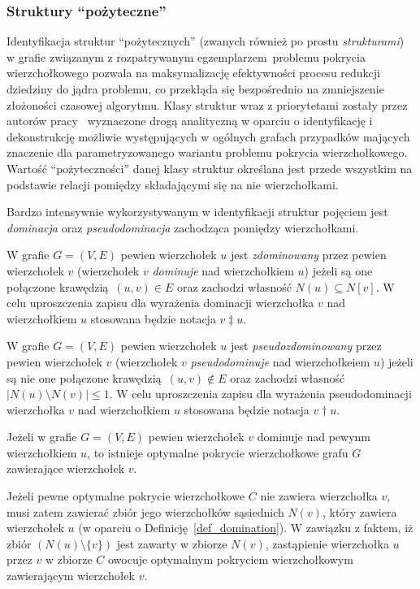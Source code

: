 \subsubsection{\textbf{Struktury ``pożyteczne''}}
\label{sss_ckx_structures}
\par{
  Identyfikacja struktur ``pożytecznych'' (zwanych również po prostu \emph{strukturami}) w grafie związanym z rozpatrywanym egzemplarzem problemu pokrycia wierzchołkowego pozwala na maksymalizację efektywności procesu redukcji dziedziny do jądra problemu, co przekłąda się bezpośrednio na zmniejszenie złożoności czasowej algorytmu. Klasy struktur wraz z priorytetami zostały przez autorów pracy~\cite{ImprovedBounds10} wyznaczone drogą analityczną w oparciu o identyfikację i dekonstrukcję możliwie występujących w ogólnych grafach przypadków mających znaczenie dla parametryzowanego wariantu problemu pokrycia wierzchołkowego.
  Wartość ``pożyteczności'' danej klasy struktur określana jest przede wszystkim na podstawie relacji pomiędzy składającymi się na nie wierzchołkami.
}
\par{
  Bardzo intensywnie wykorzystywanym w identyfikacji struktur pojęciem jest \emph{dominacja} oraz \emph{pseudodominacja} zachodząca pomiędzy wierzchołkami.
  \begin{definition}
    W grafie $G=(V, E)$ pewien wierzchołek $u$ jest \emph{zdominowany} przez pewien wierzchołek $v$ (wierzchołek $v$ \emph{dominuje} nad wierzchołkiem $u$) jeżeli są one połączone krawędzią $(u, v) \in E$ oraz zachodzi własność $N(u) \subseteq N[v]$.
    W celu uproszczenia zapisu dla wyrażenia dominacji wierzchołka $v$ nad wierzchołkiem $u$ stosowana będzie notacja $v \ddagger u$.
  \end{definition}
  \begin{definition}
    W grafie $G=(V, E)$ pewien wierzchołek $u$ jest \emph{pseudozdominowany} przez pewien wierzchołek $v$ (wierzchołek $v$ \emph{pseudodominuje} nad wierzchołkeiem $u$) jeżeli są nie one połączone krawędzią $(u, v) \notin E$ oraz zachodzi własność $|N(u) \setminus N(v)| \leq 1$.
    W celu uproszczenia zapisu dla wyrażenia pseudodominacji wierzchołka $v$ nad wierzchołkiem $u$ stosowana będzie notacja $v \dagger u$.
  \end{definition}
  \begin{theorem}
      Jeżeli w grafie $G=(V, E)$ pewien wierzchołek $v$ dominuje nad pewynm wierzchołkiem $u$, to istnieje optymalne pokrycie wierzchołkowe grafu $G$ zawierające wierzchołek $v$.
  \end{theorem}
  \begin{bproof}
    Jeżeli pewne optymalne pokrycie wierzchołkowe $C$ nie zawiera wierzchołka $v$, musi zatem zawierać zbiór jego wierzchołków sąsiednich $N(v)$, który zawiera wierzchołek $u$ (w oparciu o Definicję~\ref{def_domination}).
    W zawiązku z faktem, iż zbiór $(N(u) \setminus \{v\})$ jest zawarty w zbiorze $N(v)$, zastąpienie wierzchołka $u$ przez $v$ w zbiorze $C$ owocuje optymalnym pokryciem wierzchołkowym zawierającym wierzchołek $v$.
  \end{bproof}
}
